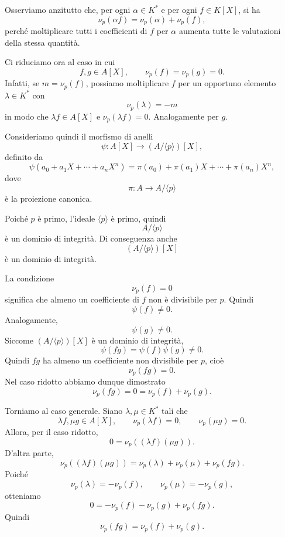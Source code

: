 \documentclass[a4paper]{article}
\begin{document}
\begin{radioactive}
\begin{snippetproof}{}
    Osserviamo anzitutto che, per ogni \(\alpha\in K^\ast\) e per ogni \(f\in K[X]\), si ha
    \[
        \nu_p(\alpha f)=\nu_p(\alpha)+\nu_p(f),
    \]
    perché moltiplicare tutti i coefficienti di \(f\) per \(\alpha\) aumenta tutte le valutazioni della stessa quantità.

    Ci riduciamo ora al caso in cui
    \[
        f,g\in A[X],
        \qquad
        \nu_p(f)=\nu_p(g)=0.
    \]
    Infatti, se \(m=\nu_p(f)\), possiamo moltiplicare \(f\) per un opportuno elemento \(\lambda\in K^\ast\) con
    \[
        \nu_p(\lambda)=-m
    \]
    in modo che \(\lambda f\in A[X]\) e \(\nu_p(\lambda f)=0\). Analogamente per \(g\).

    Consideriamo quindi il morfismo di anelli
    \[
        \psi\colon A[X]\to (A/\langle p \rangle)[X],
    \]
    definito da
    \[
        \psi(a_0+a_1X+\cdots+a_nX^n)
        =
        \pi(a_0)+\pi(a_1)X+\cdots+\pi(a_n)X^n,
    \]
    dove
    \[
        \pi\colon A\to A/\langle p \rangle
    \]
    è la proiezione canonica.

    Poiché \(p\) è primo, l'ideale \(\langle p \rangle\) è primo, quindi
    \[
        A/\langle p \rangle
    \]
    è un dominio di integrità. Di conseguenza anche
    \[
        (A/\langle p \rangle)[X]
    \]
    è un dominio di integrità.

    La condizione
    \[
        \nu_p(f)=0
    \]
    significa che almeno un coefficiente di \(f\) non è divisibile per \(p\). Quindi
    \[
        \psi(f)\neq 0.
    \]
    Analogamente,
    \[
        \psi(g)\neq 0.
    \]
    Siccome \((A/\langle p \rangle)[X]\) è un dominio di integrità,
    \[
        \psi(fg)=\psi(f)\psi(g)\neq 0.
    \]
    Quindi \(fg\) ha almeno un coefficiente non divisibile per \(p\), cioè
    \[
        \nu_p(fg)=0.
    \]
    Nel caso ridotto abbiamo dunque dimostrato
    \[
        \nu_p(fg)=0=\nu_p(f)+\nu_p(g).
    \]

    Torniamo al caso generale. Siano \(\lambda,\mu\in K^\ast\) tali che
    \[
        \lambda f,\mu g\in A[X],
        \qquad
        \nu_p(\lambda f)=0,
        \qquad
        \nu_p(\mu g)=0.
    \]
    Allora, per il caso ridotto,
    \[
        0
        =
        \nu_p((\lambda f)(\mu g)).
    \]
    D'altra parte,
    \[
        \nu_p((\lambda f)(\mu g))
        =
        \nu_p(\lambda)+\nu_p(\mu)+\nu_p(fg).
    \]
    Poiché
    \[
        \nu_p(\lambda)=-\nu_p(f),
        \qquad
        \nu_p(\mu)=-\nu_p(g),
    \]
    otteniamo
    \[
        0
        =
        -\nu_p(f)-\nu_p(g)+\nu_p(fg).
    \]
    Quindi
    \[
        \nu_p(fg)=\nu_p(f)+\nu_p(g).
    \]
\end{snippetproof}
\end{radioactive}
\end{document}

